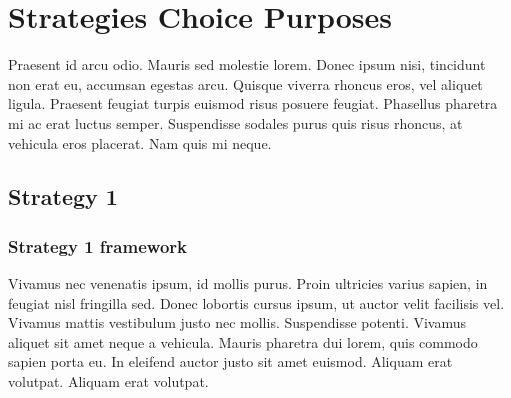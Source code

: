 \section{Strategies Choice Purposes}
Praesent id arcu odio. Mauris sed molestie lorem. Donec ipsum nisi, tincidunt non erat eu, accumsan egestas arcu. Quisque viverra rhoncus eros, vel aliquet ligula. Praesent feugiat turpis euismod risus posuere feugiat. Phasellus pharetra mi ac erat luctus semper. Suspendisse sodales purus quis risus rhoncus, at vehicula eros placerat. Nam quis mi neque.

\subsection{Strategy 1}

\subsubsection{Strategy 1 framework}
Vivamus nec venenatis ipsum, id mollis purus. Proin ultricies varius sapien, in feugiat nisl fringilla sed. Donec lobortis cursus ipsum, ut auctor velit facilisis vel. Vivamus mattis vestibulum justo nec mollis. Suspendisse potenti. Vivamus aliquet sit amet neque a vehicula. Mauris pharetra dui lorem, quis commodo sapien porta eu. In eleifend auctor justo sit amet euismod. Aliquam erat volutpat. Aliquam erat volutpat.